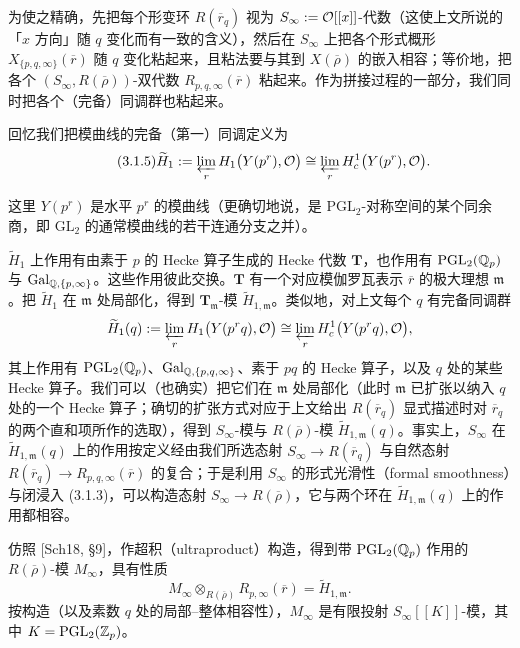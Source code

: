为使之精确，先把每个形变环 $R(\overline{r}_q)$ 视为 $S_\infty:=\mathcal{O}[[x]]$-代数（这使上文所说的「$x$ 方向」随 $q$ 变化而有一致的含义），然后在 $S_\infty$ 上把各个形式概形 $X_{\{p,q,\infty\}}(\overline{r})$ 随 $q$ 变化粘起来，且粘法要与其到 $X(\overline{\rho})$ 的嵌入相容；等价地，把各个 $(S_\infty,R(\overline{\rho}))$-双代数 $R_{p,q,\infty}(\overline{r})$ 粘起来。作为拼接过程的一部分，我们同时把各个（完备）同调群也粘起来。

回忆我们把模曲线的完备（第一）同调定义为
\begin{equation}
\tag{3.1.5}
\widetilde{H}_1:=\varprojlim_r H_1\bigl(Y(p^r),\mathcal{O}\bigr)\cong\varprojlim_r H^1_c\bigl(Y(p^r),\mathcal{O}\bigr).
\end{equation}

这里 $Y(p^r)$ 是水平 $p^r$ 的模曲线（更确切地说，是 $\mathrm{PGL}_2$-对称空间的某个同余商，即 $\mathrm{GL}_2$ 的通常模曲线的若干连通分支之并）。

$\widetilde{H}_1$ 上作用有由素于 $p$ 的 Hecke 算子生成的 Hecke 代数 $\mathbf T$，也作用有 $\mathrm{PGL}_2(\mathbb{Q}_p)$ 与 $\mathrm{Gal}_{\mathbb{Q},\{p,\infty\}}$。这些作用彼此交换。$\mathbf T$ 有一个对应模伽罗瓦表示 $\overline{r}$ 的极大理想 $\mathfrak{m}$。把 $\widetilde{H}_1$ 在 $\mathfrak{m}$ 处局部化，得到 $\mathbf T_{\mathfrak{m}}$-模 $\widetilde{H}_{1,\mathfrak{m}}$。类似地，对上文每个 $q$ 有完备同调群
\[
\widetilde{H}_1(q):=\varprojlim_r H_1\bigl(Y(p^r q),\mathcal{O}\bigr)\cong\varprojlim_r H^1_c\bigl(Y(p^r q),\mathcal{O}\bigr),
\]
其上作用有 $\mathrm{PGL}_2(\mathbb{Q}_p)$、$\mathrm{Gal}_{\mathbb{Q},\{p,q,\infty\}}$、素于 $pq$ 的 Hecke 算子，以及 $q$ 处的某些 Hecke 算子。我们可以（也确实）把它们在 $\mathfrak{m}$ 处局部化（此时 $\mathfrak{m}$ 已扩张以纳入 $q$ 处的一个 Hecke 算子；确切的扩张方式对应于上文给出 $R(\overline{r}_q)$ 显式描述时对 $\overline{r}_q$ 的两个直和项所作的选取），得到 $S_\infty$-模与 $R(\overline{\rho})$-模 $\widetilde{H}_{1,\mathfrak{m}}(q)$。事实上，$S_\infty$ 在 $\widetilde{H}_{1,\mathfrak{m}}(q)$ 上的作用按定义经由我们所选态射 $S_\infty\to R(\overline{r}_q)$ 与自然态射 $R(\overline{r}_q)\to R_{p,q,\infty}(\overline{r})$ 的复合；于是利用 $S_\infty$ 的形式光滑性（formal smoothness）与闭浸入 (3.1.3)，可以构造态射 $S_\infty\to R(\overline{\rho})$，它与两个环在 $\widetilde{H}_{1,\mathfrak{m}}(q)$ 上的作用都相容。

仿照 [Sch18, §9]，作超积（ultraproduct）构造，得到带 $\mathrm{PGL}_2(\mathbb{Q}_p)$ 作用的 $R(\overline{\rho})$-模 $M_\infty$，具有性质
\[
M_\infty\otimes_{R(\overline{\rho})}R_{p,\infty}(\overline{r})=\widetilde{H}_{1,\mathfrak{m}}.
\]
按构造（以及素数 $q$ 处的局部--整体相容性），$M_\infty$ 是有限投射 $S_\infty[[K]]$-模，其中 $K=\mathrm{PGL}_2(\mathbb{Z}_p)$。

